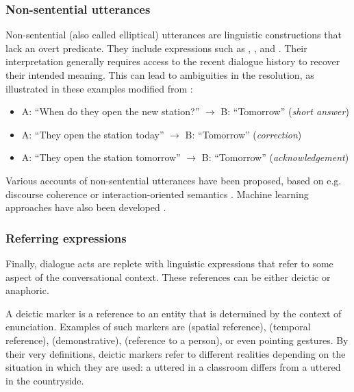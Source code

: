 \subsubsection*{Non-sentential utterances}
\label{non-sentential utterance}
Non-sentential (also called elliptical) utterances are linguistic constructions that lack an overt predicate.  They include expressions such as  , ,  and . Their interpretation generally requires access to the recent dialogue history to recover their intended meaning. This can lead to ambiguities in the resolution, as illustrated in these examples modified from \cite{Fernandez:2007}: \begin{itemize}
\item A: ``When do they open the new station?''  $\rightarrow$ B: ``Tomorrow'' (\textit{short answer})
\item A: ``They open the station today''  $\rightarrow$ B: ``Tomorrow'' (\textit{correction})
\item A: ``They open the station tomorrow''  $\rightarrow$ B: ``Tomorrow'' (\textit{acknowledgement})
\end{itemize}

Various accounts of non-sentential utterances have been proposed, based on e.g. discourse coherence \citep{Schlangen03theinterpretation} or interaction-oriented semantics \citep{fernandez2006non,Ginzburg2012}. Machine learning approaches have also been developed \citep{Schlangen:2005,Fernandez:2007}. 

\subsubsection*{Referring expressions}

Finally, dialogue acts are replete with linguistic expressions that refer to some aspect of the conversational context.  These references can be either deictic or anaphoric. 

A deictic marker is a reference to an entity that is determined by the context of enunciation.  Examples of such markers are  (spatial reference),  (temporal reference),  (demonstrative),  (reference to a person), or even pointing gestures. By their very definitions, deictic markers refer to different realities depending on the situation in which they are used: a  uttered in a classroom differs from a  uttered in the countryside.  


